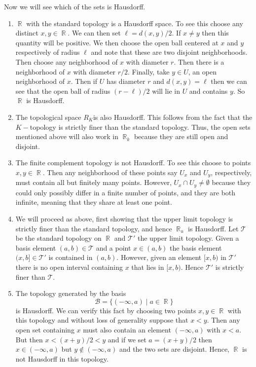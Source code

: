 \documentclass{article}
\DeclareMathOperator{\R}{\mathbb{R}}
\DeclareMathOperator{\suchthat}{\mathrel{|}}
\newcommand{\problempart}[1]{\noindent{\textbf{(#1)}}}
\begin{document}
\problempart{b} Now we will see which of the sets is Hausdorff.
\begin{enumerate}
\item $\R$ with the standard topology is a Hausdorff space. To see this choose any distinct $x,y \in \R$. We can then set $\ell = d(x,y) / 2$. If $x \neq y$ then this quantity will be positive. We then choose the open ball centered at $x$ and $y$ respectively of radius $\ell$ and note that these are two disjoint neighborhoods. Then choose any neighborhood of $x$ with diameter $r$. Then there is a neighborhood of $x$ with diameter $r/2$. Finally, take $y \in U$, an open neighborhood of $x$. Then if $U$ has diameter $r$ and $d(x,y) = \ell$ then we can see that the open ball of radius $(r - \ell)/2 $ will lie in $U$ and contains $y$. So $\R$ is Hausdorff.
\item The topological space $R_K$is also Hausdorff. This follows from the fact that the $K-$topology is strictly finer than the standard topology. Thus, the open sets mentioned above will also work in $\R_k$ because they are still open and disjoint.
\item The finite complement topology is not Hausdorff. To see this choose to points $x,y \in \R$. Then any neighborhood of these points say $U_x$ and $U_y$, respectively, must contain all but finitely many points. However, $U_x\cap U_y \neq \emptyset$ because they could only possibly differ in a finite number of points, and they are both infinite, meaning that they share at least one point. 
\item We will proceed as above, first showing that the upper limit topology is strictly finer than the standard topology, and hence $\R_u$ is Hausdorff. Let $\mathcal{T}$ be the standard topology on $\R$ and $\mathcal{T}'$ the upper limit topology. Given a basis element $(a,b) \in \mathcal{T}$ and a point $x \in (a,b)$ the basis element $(x,b] \in \mathcal{T}'$ is contained in $(a,b)$. However, given an element $[x, b)$ in $\mathcal{T}'$ there is no open interval containing $x$ that lies in $[x,b)$. Hence $\mathcal{T}'$ is strictly finer than $\mathcal{T}$.   
\item The topology generated by the basis 
\[
\mathcal{B} = \{(-\infty, a) \suchthat a \in \R\} 
\]
is Hausdorff. We can verify this fact by choosing two points $x,y \in \R$ with this topology and without loss of generality suppose that $x < y$. Then any open set containing $x$ must also contain an element $(-\infty, a)$ with $x < a$. But then $x < (x+y)/2 < y$ and if we set $a = (x+y)/2$ then $x \in (-\infty, a)$ but $y \not\in (-\infty, a)$ and the two sets are disjoint. Hence, $\R$ is not Hausdorff in this topology.
\end{enumerate}
\end{document}

